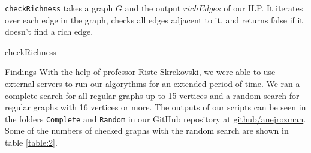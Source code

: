 \documentclass[12pt,a4paper]{amsart}
\makeatletter
\renewcommand\section{\@startsection{section}{1}
  \z@{.5\linespacing\@plus.7\linespacing}{.5\linespacing}
  {\normalfont\scshape\large\centering}}
\theoremstyle{definition} %
\theoremstyle{plain} %
\makeatother
\begin{document}
    \texttt{checkRichness} takes a graph $G$ and the output $richEdges$ of our ILP. It iterates over each edge in the graph, checks all edges adjacent to it, and returns false if it doesn't find a rich edge.\\

    \begin{algorithm}[!htbp]
        \caption{checkRichness}\label{algo:checkRichness}
        \LinesNumberedHidden
        \DontPrintSemicolon
        
        
        
        \Return {}\;
    \end{algorithm}

\pagebreak

\section{Findings}
    With the help of professor Riste Skrekovski, we were able to use external servers to run our algorythms for an extended period of time. We ran a complete search for all regular graphs up to 15 vertices and a random search for regular graphs with 16 vertices or more. The outputs of our scripts can be seen in the folders \texttt{Complete} and \texttt{Random} in our GitHub repository at \href{https://github.com/anejrozman/Rich-neighbour-edge-coloring}{github/anejrozman}. Some of the numbers of checked graphs with the random search are shown in table \ref{table:2}.
\end{document}

